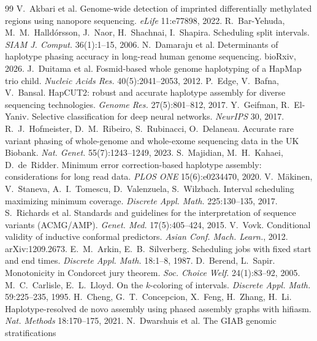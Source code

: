 \documentclass[11pt]{article}
\begin{document}
\begin{thebibliography}{99}
\footnotesize\setlength{\itemsep}{0pt}\setlength{\parskip}{0pt}
 V.~Akbari et al. Genome-wide detection of imprinted
differentially methylated regions using nanopore sequencing. \emph{eLife}
11:e77898, 2022.
 R.~Bar-Yehuda, M.~M.~Halld\'orsson, J.~Naor,
H.~Shachnai, I.~Shapira. Scheduling split intervals. \emph{SIAM J. Comput.}
36(1):1--15, 2006.
 N.~Damaraju et al. Determinants of haplotype phasing
accuracy in long-read human genome sequencing. bioRxiv, 2026.
 J.~Duitama et al. Fosmid-based whole genome
haplotyping of a HapMap trio child. \emph{Nucleic Acids Res.}
40(5):2041--2053, 2012.
 P.~Edge, V.~Bafna, V.~Bansal. HapCUT2: robust and accurate
haplotype assembly for diverse sequencing technologies. \emph{Genome Res.}
27(5):801--812, 2017.
 Y.~Geifman, R.~El-Yaniv. Selective classification for
deep neural networks. \emph{NeurIPS} 30, 2017.
 R.~J.~Hofmeister, D.~M.~Ribeiro, S.~Rubinacci,
O.~Delaneau. Accurate rare variant phasing of whole-genome and whole-exome
sequencing data in the UK Biobank. \emph{Nat. Genet.} 55(7):1243--1249, 2023.
 S.~Majidian, M.~H.~Kahaei, D.~de~Ridder. Minimum error
correction-based haplotype assembly: considerations for long read data.
\emph{PLOS ONE} 15(6):e0234470, 2020.
 V.~M\"akinen, V.~Staneva, A.~I.~Tomescu,
D.~Valenzuela, S.~Wilzbach. Interval scheduling maximizing minimum coverage.
\emph{Discrete Appl. Math.} 225:130--135, 2017.
 S.~Richards et al. Standards and guidelines for the
interpretation of sequence variants (ACMG/AMP). \emph{Genet. Med.}
17(5):405--424, 2015.
 V.~Vovk. Conditional validity of inductive conformal
predictors. \emph{Asian Conf. Mach. Learn.}, 2012. arXiv:1209.2673.
 E.~M.~Arkin, E.~B.~Silverberg. Scheduling jobs with fixed
start and end times. \emph{Discrete Appl. Math.} 18:1--8, 1987.
 D.~Berend, L.~Sapir. Monotonicity in Condorcet jury
theorem. \emph{Soc. Choice Welf.} 24(1):83--92, 2005.
 M.~C.~Carlisle, E.~L.~Lloyd. On the $k$-coloring of
intervals. \emph{Discrete Appl. Math.} 59:225--235, 1995.
 H.~Cheng, G.~T.~Concepcion, X.~Feng, H.~Zhang, H.~Li.
Haplotype-resolved de novo assembly using phased assembly graphs with
hifiasm. \emph{Nat. Methods} 18:170--175, 2021.
 N.~Dwarshuis et al. The GIAB genomic stratifications

\end{thebibliography}
\end{document}

